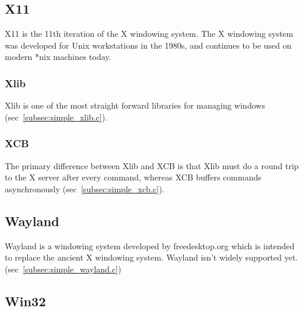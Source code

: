 \documentclass{article}
\begin{document}

\subsection{X11}
\label{subsec:x11}

X11 is the 11th iteration of the X windowing system.
The X windowing system was developed for Unix workstations in the 1980s,
and continues to be used on modern *nix machines today.

\subsubsection{Xlib}
\label{subsubsec:xlib}

Xlib is one of the most straight forward libraries for managing windows
(sec~\ref{subsec:simple_xlib.c}).

\subsubsection{XCB}
\label{subsubsec:xcb}

The primary difference between Xlib and XCB is that Xlib must do a round trip
to the X server after every command,
whereas XCB buffers commands asynchronously (sec~\ref{subsec:simple_xcb.c}).


\subsection{Wayland}
\label{subsec:wayland}

Wayland is a windowing system developed by freedesktop.org which is intended to
replace the ancient X windowing system.
Wayland isn't widely supported yet.
(sec~\ref{subsec:simple_wayland.c})


\subsection{Win32}
\label{subsec:win32}
\end{document}
